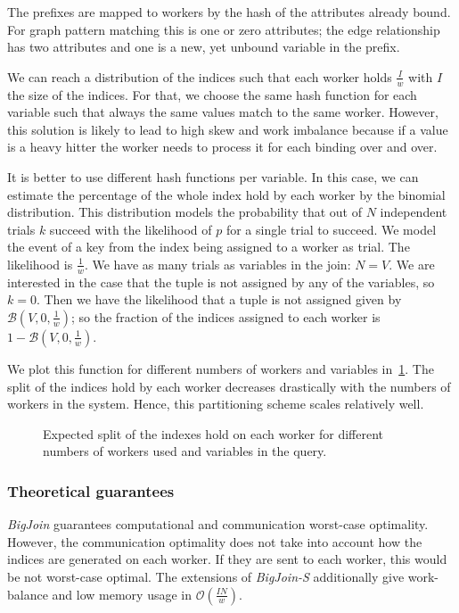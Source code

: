 The prefixes are mapped to workers  by the hash of the attributes already bound.
For graph pattern matching this is one or zero attributes;
the edge relationship has two attributes and one is a new, yet unbound variable in the prefix.

We can reach a distribution of the indices such that each worker holds $\frac{I}{w}$ with $I$ the size of the indices.
For that, we choose the same hash function for each variable such that always the same values match to the same worker.
However, this solution is likely to lead to high skew and work imbalance because if a value is a heavy hitter the
worker needs to process it for each binding over and over.

It is better to use different hash functions per variable.
In this case, we can estimate the percentage of the whole index hold by each worker by the binomial distribution.
This distribution models the probability that out of $N$ independent trials $k$ succeed with the likelihood of $p$ for a single trial
to succeed.
We model the event of a key from the index being assigned to a worker as trial.
The likelihood is $\frac{1}{w}$.
We have as many trials as variables in the join: $N = V$.
We are interested in the case that the tuple is not assigned by any of the variables, so $k = 0$.
Then we have the likelihood that a tuple is not assigned given by $\mathcal{B} (V, 0, \frac{1}{w})$;
so the fraction of the indices assigned to each worker is $1 - \mathcal{B} (V, 0, \frac{1}{w})$.

We plot this function for different numbers of workers and variables in~\cref{fig:big-join-indices}.
The split of the indices hold by each worker decreases drastically with the numbers of workers in
the system.
Hence, this partitioning scheme scales relatively well.

\begin{figure}
    \centering
    
    \caption{Expected split of the indexes hold on each worker for different numbers of workers used
      and variables in the query.
    }
    \label{fig:big-join-indices}
\end{figure}

\subsubsection{Theoretical guarantees}
\textit{BigJoin} guarantees computational and communication worst-case optimality.
However, the communication optimality does not take into account how the indices are generated on each worker.
If they are sent to each worker, this would be not worst-case optimal.
The extensions of \textit{BigJoin-S} additionally give work-balance and low memory usage in $\mathcal{O} (\frac{IN}{w})$.

